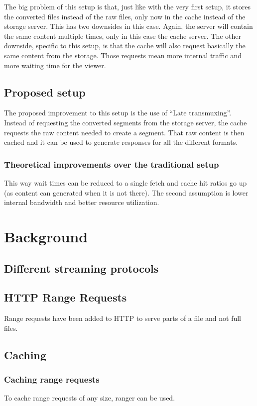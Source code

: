 \documentclass[twoside,openright]{uva-bachelor-thesis}
\begin{document}
The big problem of this setup is that, just like with the very first setup, it
stores the converted files instead of the raw files, only now in the cache
instead of the storage server. This has two downsides in this case. Again, the
server will contain the same content multiple times, only in this case the cache
server. The other downside, specific to this setup, is that the cache will also
request basically the same content from the storage. Those requests mean more
internal traffic and more waiting time for the viewer.

\section{Proposed setup}
The proposed improvement to this setup is the use of ``Late transmuxing''.
Instead of requesting the converted segments from the storage server, the cache
requests the raw content needed to create a segment. That raw content is then
cached and it can be used to generate responses for all the different formats.

\subsection{Theoretical improvements over the traditional setup}
This way wait times can be reduced to a single fetch and cache
hit ratios go up (as content can generated when it is not there). The second
assumption is lower internal bandwidth and better resource utilization.


\chapter{Background}
\section{Different streaming protocols}
\section{HTTP Range Requests}
Range requests have been added to HTTP to serve parts of a file and not full
files.~\autocite{rangerequests}
\section{Caching}
\subsection{Caching range requests}
To cache range requests of any size, ranger \autocite{ranger} can be used.
\end{document}
